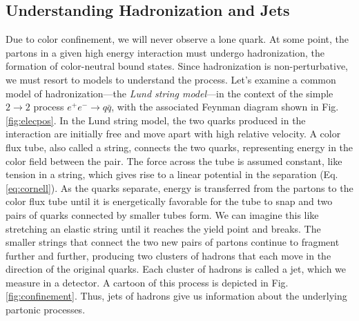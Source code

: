 \documentclass[../main.tex]{subfiles}
\begin{document}
\subsection{Understanding Hadronization and Jets}

Due to color confinement, we will never observe a lone quark. At some point, the partons in a given high energy interaction must undergo hadronization, the formation of color-neutral bound states. Since hadronization is non-perturbative, we must resort to models to understand the process. Let's examine a common model of hadronization---the \textit{Lund string model}---in the context of the simple $2 \rightarrow 2$ process $e^+e^- \rightarrow q\bar{q}$, with the associated Feynman diagram shown in Fig. \ref{fig:elecpos}. In the Lund string model, the two quarks produced in the interaction are initially free and move apart with high relative velocity. A color flux tube, also called a string, connects the two quarks, representing energy in the color field between the pair. The force across the tube is assumed constant, like tension in a string, which gives rise to a linear potential in the separation (Eq. \ref{eq:cornell}). As the quarks separate, energy is transferred from the partons to the color flux tube until it is energetically favorable for the tube to snap and two pairs of quarks connected by smaller tubes form. We can imagine this like stretching an elastic string until it reaches the yield point and breaks. The smaller strings that connect the two new pairs of partons continue to fragment further and further, producing two clusters of hadrons that each move in the direction of the original quarks. Each cluster of hadrons is called a jet, which we measure in a detector. A cartoon of this process is depicted in Fig. \ref{fig:confinement}. Thus, jets of hadrons give us information about the underlying partonic processes.
\end{document}
